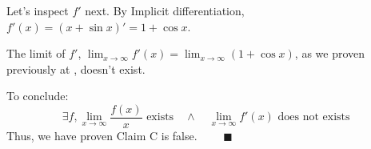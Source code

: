 \documentclass[12pt]{exam}
\newcommand*\circled[1]{\tikz[baseline=(char.base)]{
    \node[shape=circle, draw, inner sep=1pt, 
        minimum height=12pt] (char) {#1};}}
\begin{document}
\begin{enumerate}
\begin{enumerate}
			Let's inspect $f'$ next. By Implicit differentiation, $f'(x)=(x+\sin{x})'=1+\cos{x}$.
		    
			The limit of $f'$, $\lim_{x \to \infty}f'(x)=\lim_{x \to \infty}(1+\cos{x})$, as we proven previously at \circled{7}, doesn't exist.
			
			To conclude:
		    $$
				\exists f, \lim_{x \to \infty} \frac{f(x)}{x} \mbox{ exists} \quad \land \quad \lim_{x \to \infty} f'(x) \mbox{ does not exists }
		    $$
		    Thus, we have proven Claim C is false. $\qquad\blacksquare$
		    
	\end{enumerate}

\end{enumerate}
\end{document}
